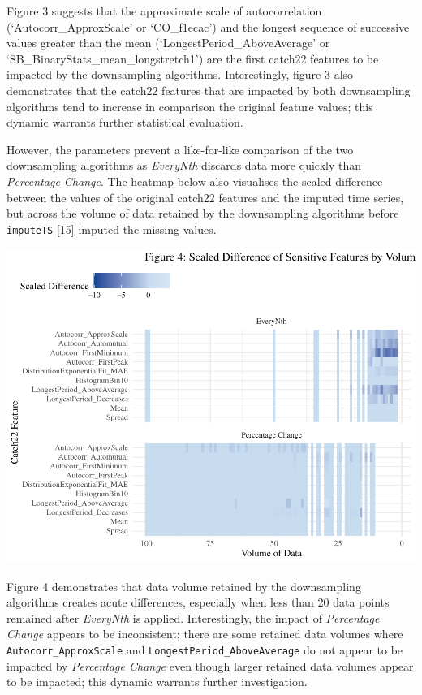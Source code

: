 \documentclass{article}
\begin{document}
Figure 3 suggests that the approximate scale of autocorrelation
(`Autocorr\_ApproxScale' or `CO\_f1ecac') and the longest sequence of
successive values greater than the mean (`LongestPeriod\_AboveAverage'
or `SB\_BinaryStats\_mean\_longstretch1') are the first catch22 features
to be impacted by the downsampling algorithms. Interestingly, figure 3
also demonstrates that the catch22 features that are impacted by both
downsampling algorithms tend to increase in comparison the original
feature values; this dynamic warrants further statistical evaluation.

However, the parameters prevent a like-for-like comparison of the two
downsampling algorithms as \emph{EveryNth} discards data more quickly
than \emph{Percentage Change}. The heatmap below also visualises the
scaled difference between the values of the original catch22 features
and the imputed time series, but across the volume of data retained by
the downsampling algorithms before \texttt{imputeTS}
\protect\hyperlink{ref-imputeTS_R}{{[}15{]}} imputed the missing values.

\includegraphics{210431461_CSC8639_Dissertation_files/figure-latex/Heatmap_vol-1.pdf}

Figure 4 demonstrates that data volume retained by the downsampling
algorithms creates acute differences, especially when less than 20 data
points remained after \emph{EveryNth} is applied. Interestingly, the
impact of \emph{Percentage Change} appears to be inconsistent; there are
some retained data volumes where \texttt{Autocorr\_ApproxScale} and
\texttt{LongestPeriod\_AboveAverage} do not appear to be impacted by
\emph{Percentage Change} even though larger retained data volumes appear
to be impacted; this dynamic warrants further investigation.
\end{document}
